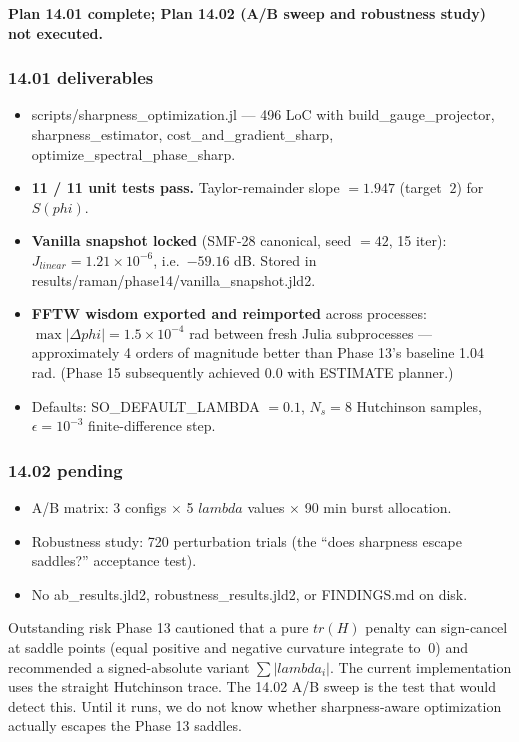 \documentclass[11pt,letterpaper]{article}
\def\varphi{phi}%
\def\mathrm#1{#1}%
\def\lambda{lambda}%
\def\approx{~}%
\def\texttt#1{#1}%
\begin{document}
\textbf{Plan 14.01 complete; Plan 14.02 (A/B sweep and robustness study) not executed.}

\subsubsection{14.01 deliverables}

\begin{itemize}[leftmargin=*]
  \item \texttt{scripts/sharpness\_optimization.jl} --- 496 LoC with \texttt{build\_gauge\_projector}, \texttt{sharpness\_estimator}, \texttt{cost\_and\_gradient\_sharp}, \texttt{optimize\_spectral\_phase\_sharp}.
  \item \textbf{11 / 11 unit tests pass.} Taylor-remainder slope $= 1.947$ (target $\approx 2$) for $S(\varphi)$.
  \item \textbf{Vanilla snapshot locked} (SMF-28 canonical, seed $= 42$, 15 iter): $J_{\mathrm{linear}} = 1.21 \times 10^{-6}$, i.e.\ $-59.16$ dB. Stored in \texttt{results/raman/phase14/vanilla\_snapshot.jld2}.
  \item \textbf{FFTW wisdom exported and reimported} across processes: $\max|\Delta\varphi| = 1.5 \times 10^{-4}$ rad between fresh Julia subprocesses --- approximately 4 orders of magnitude better than Phase 13's baseline 1.04 rad. (Phase 15 subsequently achieved 0.0 with ESTIMATE planner.)
  \item Defaults: \texttt{SO\_DEFAULT\_LAMBDA $= 0.1$}, $N_s = 8$ Hutchinson samples, $\epsilon = 10^{-3}$ finite-difference step.
\end{itemize}

\subsubsection{14.02 pending}

\begin{itemize}[leftmargin=*]
  \item A/B matrix: 3 configs $\times$ 5 $\lambda$ values $\times$ 90 min burst allocation.
  \item Robustness study: 720 perturbation trials (the ``does sharpness escape saddles?'' acceptance test).
  \item No \texttt{ab\_results.jld2}, \texttt{robustness\_results.jld2}, or \texttt{FINDINGS.md} on disk.
\end{itemize}

\begin{blocker}{Outstanding risk}
Phase 13 cautioned that a pure $\mathrm{tr}(H)$ penalty can sign-cancel at saddle points (equal positive and negative curvature integrate to $\approx 0$) and recommended a signed-absolute variant $\sum |\lambda_i|$. The current implementation uses the straight Hutchinson trace. The 14.02 A/B sweep is the test that would detect this. Until it runs, we do not know whether sharpness-aware optimization actually escapes the Phase 13 saddles.
\end{blocker}
\end{document}
